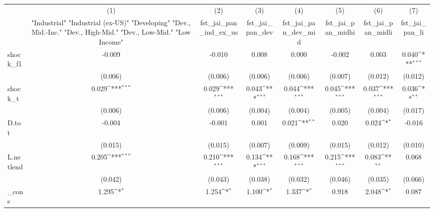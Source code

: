 {
\def\sym#1{\ifmmode^{#1}\else\(^{#1}\)\fi}
\begin{tabular}{l*{7}{c}}
\toprule
            &\multicolumn{1}{c}{(1)}&\multicolumn{1}{c}{(2)}&\multicolumn{1}{c}{(3)}&\multicolumn{1}{c}{(4)}&\multicolumn{1}{c}{(5)}&\multicolumn{1}{c}{(6)}&\multicolumn{1}{c}{(7)}\\
            &\multicolumn{1}{c}{ "Industrial" "Industrial (ex-US)" "Developing" "Dev., Mid.-Inc." "Dev., High-Mid."  "Dev., Low-Mid." "Low Income" }&\multicolumn{1}{c}{fst\_jai\_pan\_ind\_ex\_us}&\multicolumn{1}{c}{fst\_jai\_pan\_dev}&\multicolumn{1}{c}{fst\_jai\_pan\_dev\_mid}&\multicolumn{1}{c}{fst\_jai\_pan\_midhi}&\multicolumn{1}{c}{fst\_jai\_pan\_midli}&\multicolumn{1}{c}{fst\_jai\_pan\_li}\\
\midrule
shock\_f1    &      -0.009         &      -0.010         &       0.008         &       0.000         &      -0.002         &       0.003         &       0.040\sym{***}\\
            &     (0.006)         &     (0.006)         &     (0.006)         &     (0.006)         &     (0.007)         &     (0.012)         &     (0.012)         \\
\addlinespace
shock\_t     &       0.029\sym{***}&       0.029\sym{***}&       0.043\sym{***}&       0.044\sym{***}&       0.045\sym{***}&       0.037\sym{***}&       0.036\sym{**} \\
            &     (0.006)         &     (0.006)         &     (0.004)         &     (0.004)         &     (0.005)         &     (0.004)         &     (0.017)         \\
\addlinespace
D.tot       &      -0.004         &      -0.001         &       0.001         &       0.021\sym{**} &       0.020         &       0.024\sym{*}  &      -0.016         \\
            &     (0.015)         &     (0.015)         &     (0.007)         &     (0.009)         &     (0.015)         &     (0.012)         &     (0.010)         \\
\addlinespace
L.netlend   &       0.205\sym{***}&       0.210\sym{***}&       0.134\sym{***}&       0.168\sym{***}&       0.215\sym{***}&       0.083\sym{**} &       0.068         \\
            &     (0.042)         &     (0.043)         &     (0.038)         &     (0.032)         &     (0.046)         &     (0.035)         &     (0.066)         \\
\addlinespace
\_cons      &       1.295\sym{*}  &       1.254\sym{*}  &       1.100\sym{*}  &       1.337\sym{*}  &       0.918         &       2.048\sym{*}  &       0.087         \\

\end{tabular}}
